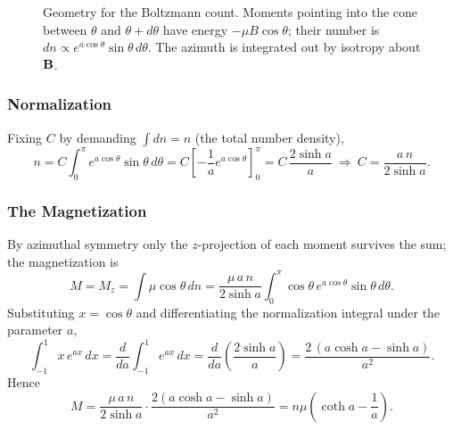 \begin{figure}[h]
\centering
{}
\caption{Geometry for the Boltzmann count. Moments pointing into the cone between $\theta$
and $\theta+d\theta$ have energy $-\mu B\cos\theta$; their number is
$dn\propto e^{a\cos\theta}\sin\theta\,d\theta$. The azimuth is integrated out by isotropy
about $\mathbf{B}$.}
\label{fig:lec19-strip}
\end{figure}

\subsubsection*{Normalization}
Fixing $C$ by demanding $\int dn=n$ (the total number density),
\begin{equation}\label{eq:lec19-norm}
  n=C\int_0^{\pi}e^{a\cos\theta}\sin\theta\,d\theta
   =C\left[-\frac{1}{a}e^{a\cos\theta}\right]_0^{\pi}
   =C\,\frac{2\sinh a}{a}
  \ \Rightarrow\
  C=\frac{a\,n}{2\sinh a}.
\end{equation}

\subsubsection*{The Magnetization}
By azimuthal symmetry only the $z$-projection of each moment survives the sum; the
magnetization is
\begin{equation}\label{eq:lec19-Mz-int}
  M=M_z=\int \mu\cos\theta\,dn
   =\frac{\mu\,a\,n}{2\sinh a}\int_0^{\pi}\cos\theta\,e^{a\cos\theta}\sin\theta\,d\theta .
\end{equation}
Substituting $x=\cos\theta$ and differentiating the normalization integral under the
parameter $a$,
\begin{equation}\label{eq:lec19-Ideriv}
  \int_{-1}^{1}x\,e^{ax}\,dx
  =\frac{d}{da}\int_{-1}^{1}e^{ax}\,dx
  =\frac{d}{da}\!\left(\frac{2\sinh a}{a}\right)
  =\frac{2\,(a\cosh a-\sinh a)}{a^2}.
\end{equation}
Hence
\begin{equation}\label{eq:lec19-Mz-langevin}
  M=\frac{\mu\,a\,n}{2\sinh a}\cdot\frac{2(a\cosh a-\sinh a)}{a^2}
   =n\mu\left(\coth a-\frac1a\right).
\end{equation}

